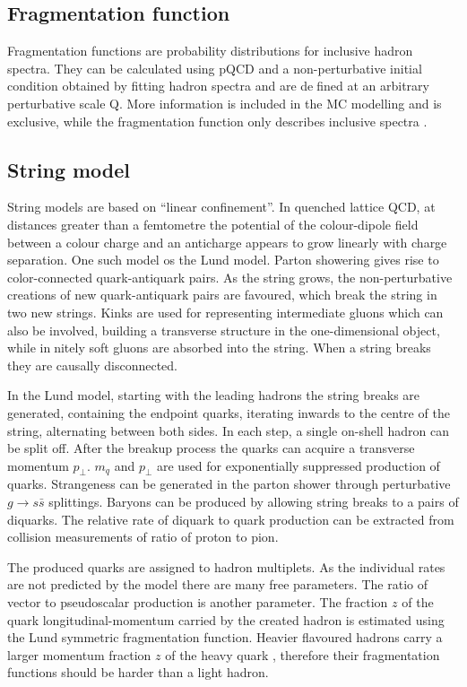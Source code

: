 \subsection{Fragmentation function}

Fragmentation functions are probability distributions for inclusive hadron spectra. They can be calculated using pQCD and a non-perturbative initial condition obtained by fitting hadron spectra and are defined at an arbitrary perturbative scale Q. More information is included in the MC modelling and is exclusive, while the fragmentation function only describes inclusive spectra \cite{Peterson:1982ak}.

\subsection{String model}

String models are based on ``linear confinement''. In quenched lattice QCD, at distances greater than a femtometre the potential of the colour-dipole field between a colour charge and an anticharge appears to grow linearly with charge separation. One such model os the Lund model. Parton showering gives rise to color-connected quark-antiquark pairs. As the string grows, the non-perturbative creations of new quark-antiquark pairs are favoured, which break the string in two new strings. Kinks are used for representing intermediate gluons which can also be involved, building a transverse structure in the one-dimensional object, while innitely soft gluons are absorbed into the string. When a string breaks they are causally disconnected.

In the Lund model, starting with the leading hadrons the string breaks are generated, containing the endpoint quarks, iterating inwards to the centre of the string, alternating between both sides. In each step, a single on-shell hadron can be split off. After the breakup process the quarks can acquire a transverse momentum $p_{\perp}$. $m_{q}$ and $p_{\perp}$ are used for exponentially suppressed production of quarks. Strangeness can be generated in the parton shower through perturbative $g \to s\bar{s}$ splittings. Baryons can be produced by allowing string breaks to a pairs of diquarks. The relative rate of diquark to quark production can be extracted from collision measurements of ratio of proton to pion.

The produced quarks are assigned to hadron multiplets. As the individual rates are not predicted by the model there are many free parameters. The ratio of vector to pseudoscalar production is another parameter. The fraction $z$ of the quark longitudinal-momentum carried by the created hadron is estimated using the Lund symmetric fragmentation function. Heavier flavoured hadrons carry a larger momentum fraction $z$ of the heavy quark \cite{Bjorken:1977md}, therefore their fragmentation functions should be harder than a light hadron.

